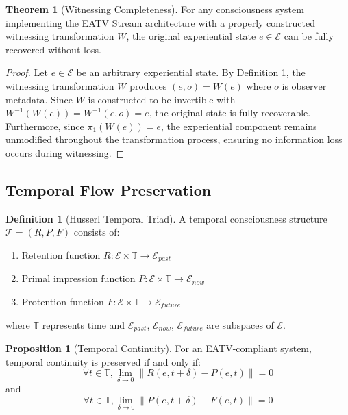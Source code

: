 \documentclass[11pt]{article}
\theoremstyle{definition}
\newtheorem{definition}{Definition}
\newtheorem{theorem}{Theorem}
\newtheorem{proposition}{Proposition}
\begin{document}
\begin{theorem}[Witnessing Completeness]
For any consciousness system implementing the EATV Stream architecture with a properly constructed witnessing transformation $W$, the original experiential state $e \in \mathcal{E}$ can be fully recovered without loss.
\end{theorem}

\begin{proof}
Let $e \in \mathcal{E}$ be an arbitrary experiential state. By Definition 1, the witnessing transformation $W$ produces $(e, o) = W(e)$ where $o$ is observer metadata. Since $W$ is constructed to be invertible with $W^{-1}(W(e)) = W^{-1}(e, o) = e$, the original state is fully recoverable. Furthermore, since $\pi_1(W(e)) = e$, the experiential component remains unmodified throughout the transformation process, ensuring no information loss occurs during witnessing.
\end{proof}

\subsection{Temporal Flow Preservation}

\begin{definition}[Husserl Temporal Triad]
A temporal consciousness structure $\mathcal{T} = (R, P, F)$ consists of:
\begin{enumerate}
    \item Retention function $R: \mathcal{E} \times \mathbb{T} \rightarrow \mathcal{E}_{past}$
    \item Primal impression function $P: \mathcal{E} \times \mathbb{T} \rightarrow \mathcal{E}_{now}$
    \item Protention function $F: \mathcal{E} \times \mathbb{T} \rightarrow \mathcal{E}_{future}$
\end{enumerate}
where $\mathbb{T}$ represents time and $\mathcal{E}_{past}$, $\mathcal{E}_{now}$, $\mathcal{E}_{future}$ are subspaces of $\mathcal{E}$.
\end{definition}

\begin{proposition}[Temporal Continuity]
For an EATV-compliant system, temporal continuity is preserved if and only if:
\begin{equation}
\forall t \in \mathbb{T}, \lim_{\delta \to 0} \| R(e, t+\delta) - P(e, t) \| = 0
\end{equation}
and
\begin{equation}
\forall t \in \mathbb{T}, \lim_{\delta \to 0} \| P(e, t+\delta) - F(e, t) \| = 0
\end{equation}
\end{proposition}
\end{document}

